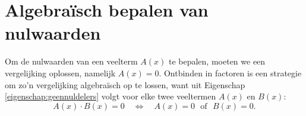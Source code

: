 \documentclass{ximera}
\begin{document}
	\author{Koen de Naeghel - Wiskunde Op Maat}







	\section{Algebra\"isch bepalen van nulwaarden} 

	Om de nulwaarden van een veelterm $A(x)$ te bepalen, moeten we een vergelijking oplossen, namelijk $A(x) = 0$. Ontbinden in factoren is een strategie om zo'n vergelijking algebra\"isch op te lossen, want 
	uit Eigenschap \ref{eigenschap:geennuldelers} volgt voor elke twee veeltermen $A(x)$ en $B(x)$:
	\[
	A(x) \cdot B(x) = 0 \quad \Leftrightarrow \quad A(x) = 0 \,\, \text{ of } \,\, B(x)=0. 
	\]  
	
\end{document}

